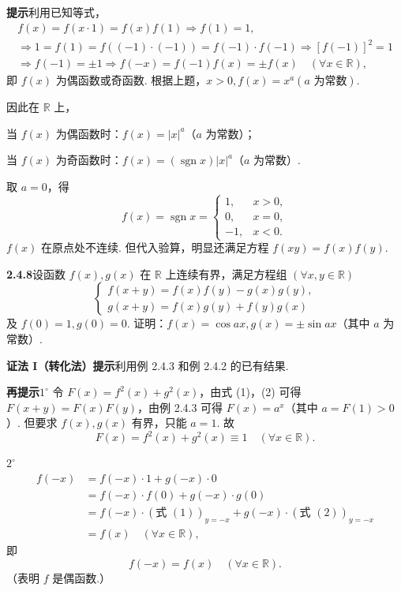 \documentclass[UTF8,12pt,a4paper,fontset=fandol]{ctexart}
\begin{document}
\noindent\textbf{提示}\quad 利用已知等式，
\[
\begin{gathered}
f(x)=f(x\cdot1)=f(x)f(1)\Rightarrow f(1)=1,\\
\Rightarrow1=f(1)=f((-1)\cdot(-1))=f(-1)\cdot f(-1)\Rightarrow[f(-1)]^2=1\\
\Rightarrow f(-1)=\pm1\Rightarrow f(-x)=f(-1)f(x)=\pm f(x)\quad(\forall x\in\mathbb{R}),
\end{gathered}
\]
即 $f(x)$ 为偶函数或奇函数. 根据上题，$x>0,f(x)=x^a(a\text{ 为常数})$.

因此在 $\mathbb{R}$ 上，

当 $f(x)$ 为偶函数时：$f(x)=|x|^a$（$a$ 为常数）；

当 $f(x)$ 为奇函数时：$f(x)=(\operatorname{sgn} x)|x|^a$（$a$ 为常数）.

取 $a=0$，得
\[
  f(x)=\operatorname{sgn} x=
  \begin{cases}
    1, & x>0,\\
    0, & x=0,\\
    -1, & x<0.
  \end{cases}
\]
$f(x)$ 在原点处不连续. 但代入验算，明显还满足方程 $f(xy)=f(x)f(y)$.

\noindent\textbf{2.4.8}\quad 设函数 $f(x),g(x)$ 在 $\mathbb{R}$ 上连续有界，满足方程组 $(\forall x,y\in\mathbb{R})$
\[
\begin{cases}
f(x+y)=f(x)f(y)-g(x)g(y),\\
g(x+y)=f(x)g(y)+f(y)g(x)
\end{cases} \tag{1}
\]
及 $f(0)=1,g(0)=0$. 证明：$f(x)=\cos ax,g(x)=\pm\sin ax$（其中 $a$ 为常数）.

\noindent\textbf{证法 I（转化法）}\quad \textbf{提示}\quad 利用例 2.4.3 和例 2.4.2 的已有结果.

\noindent\textbf{再提示}\quad $1^\circ$ 令 $F(x)=f^2(x)+g^2(x)$，由式 (1)，(2) 可得 $F(x+y)=F(x)F(y)$，由例 2.4.3 可得 $F(x)=a^x$（其中 $a=F(1)>0$）. 但要求 $f(x),g(x)$ 有界，只能 $a=1$. 故
\[
  F(x)=f^2(x)+g^2(x)\equiv1\quad(\forall x\in\mathbb{R}). \tag{3}
\]

$2^\circ$
\[
\begin{aligned}
f(-x)
&=f(-x)\cdot1+g(-x)\cdot0\\
&=f(-x)\cdot f(0)+g(-x)\cdot g(0)\\
&=f(-x)\cdot(\text{式 }(1))_{y=-x}+g(-x)\cdot(\text{式 }(2))_{y=-x}\\
&=f(x)\quad(\forall x\in\mathbb{R}),
\end{aligned} \tag{4}
\]
即
\[
  f(-x)=f(x)\quad(\forall x\in\mathbb{R}).
\]
（表明 $f$ 是偶函数.）
\end{document}
